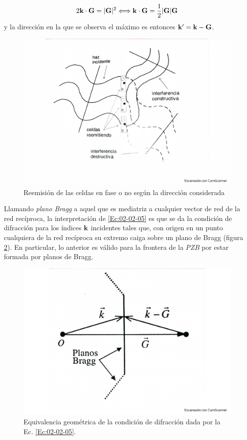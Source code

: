\begin{equation}
    2 \mathbf{k} \cdot \mathbf{G} = |\mathbf{G}|^2 \Longleftrightarrow \mathbf{k} \cdot \mathbf{G} = \frac{1}{2} |\mathbf{G}|  \mathbf{G}\label{Ec:02-02-05}
\end{equation}
y la dirección en la que se observa el máximo es entonces $\mathbf{k}'=\mathbf{k}-\mathbf{G}$. 


\begin{figure}[h!] \centering
    \includegraphics[scale=0.40]{Cuerpo/Ch_02/Fotos_libro 4.pdf}
    \caption{Reemisión de las celdas en fase o no según la dirección considerada}
    \label{Fig:02-04}
\end{figure}

Llamando \textit{plano Bragg} a aquel que es mediatriz a cualquier vector de red de la red recíproca, la interpretación de \ref{Ec:02-02-05} es que se da la condición de difracción para los índices $\mathbf{k}$ incidentes tales que, con origen en un punto cualquiera de la red recíproca su extremo caiga sobre un plano de Bragg (figura \ref{Fig:02-05}). En particular, lo anterior es válido para la frontera de la \textit{PZB} por estar formada por planos de Bragg. 

\begin{figure}[h!] \centering
    \includegraphics[scale=0.35]{Cuerpo/Ch_02/Fotos_libro 5.pdf}
    \caption{Equivalencia geométrica de la condición de difracción dada por la Ec. \ref{Ec:02-02-05}.}
    \label{Fig:02-05}
\end{figure}

